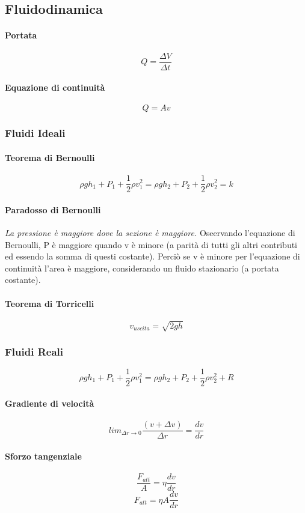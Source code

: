 \documentclass[12pt]{article}
\begin{document}
    \subsection{Fluidodinamica}
    \paragraph*{Portata}
    \[Q = \frac{\Delta V}{\Delta t}\]
    \paragraph*{Equazione di continuità}
    \[Q = Av\]
        \subsubsection{Fluidi Ideali}
        \paragraph*{Teorema di Bernoulli}
        \[\rho g h_1 + P_1 + \frac{1}{2} \rho v_1^2 = \rho g h_2 + P_2 + \frac{1}{2} \rho v_2^2 = k\]
        \paragraph*{Paradosso di Bernoulli}
        \emph{La pressione è maggiore dove la sezione è maggiore.} 
        Oseervando l'equazione di Bernoulli, P è maggiore 
        quando v è minore (a parità di tutti gli altri contributi ed essendo la somma di questi costante).
        Perciò se v è minore per l'equazione di continuità l'area
        è maggiore, considerando un fluido stazionario (a portata costante).
        \paragraph*{Teorema di Torricelli}
        \[v_{uscita} = \sqrt{2gh}\]
        \subsubsection{Fluidi Reali}
        \[\rho g h_1 + P_1 + \frac{1}{2} \rho v_1^2 = \rho g h_2 + P_2 + \frac{1}{2} \rho v_2^2 + R\]
        \[\]
        \paragraph*{Gradiente di velocità}
        \[lim_{\Delta r \to 0}{\frac{(v + \Delta v)}{\Delta r}} = \frac{dv}{dr}\]
        \paragraph*{Sforzo tangenziale}
        \[\frac{F_{att}}{A} = \eta \frac{dv}{dr}\]
        \[F_{att} = \eta A \frac{dv}{dr}\]
\end{document}
